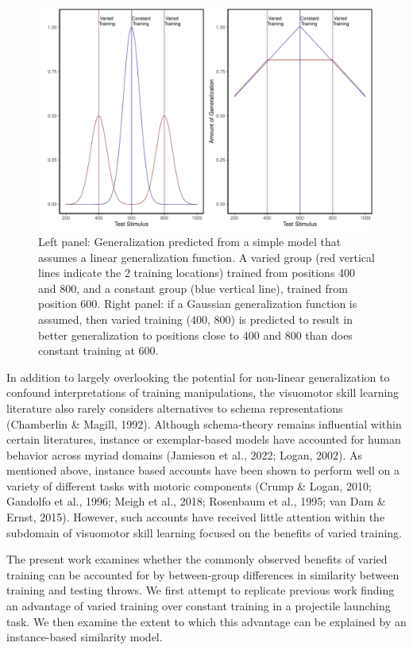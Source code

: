 \documentclass[
  man,floatsintext]{apa7}
\begin{document}
\begin{figure}
\centering
\includegraphics{IGAS_PJ_files/figure-latex/ModelFig1-1.pdf}
\caption{\label{fig:ModelFig1}Left panel: Generalization predicted from a simple model that assumes a linear generalization function. A varied group (red vertical lines indicate the 2 training locations) trained from positions 400 and 800, and a constant group (blue vertical line), trained from position 600. Right panel: if a Gaussian generalization function is assumed, then varied training (400, 800) is predicted to result in better generalization to positions close to 400 and 800 than does constant training at 600.}
\end{figure}

In addition to largely overlooking the potential for non-linear generalization to confound interpretations of training manipulations, the visuomotor skill learning literature also rarely considers alternatives to schema representations (Chamberlin \& Magill, 1992). Although schema-theory remains influential within certain literatures, instance or exemplar-based models have accounted for human behavior across myriad domains (Jamieson et al., 2022; Logan, 2002). As mentioned above, instance based accounts have been shown to perform well on a variety of different tasks with motoric components (Crump \& Logan, 2010; Gandolfo et al., 1996; Meigh et al., 2018; Rosenbaum et al., 1995; van Dam \& Ernst, 2015). However, such accounts have received little attention within the subdomain of visuomotor skill learning focused on the benefits of varied training.

The present work examines whether the commonly observed benefits of varied training can be accounted for by between-group differences in similarity between training and testing throws. We first attempt to replicate previous work finding an advantage of varied training over constant training in a projectile launching task. We then examine the extent to which this advantage can be explained by an instance-based similarity model.
\end{document}

